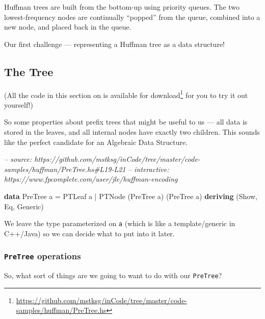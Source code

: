 \documentclass[]{article}
\newenvironment{Shaded}{}{}
\newcommand{\CommentTok}[1]{\textcolor[rgb]{0.38,0.63,0.69}{\textit{#1}}}
\newcommand{\DataTypeTok}[1]{\textcolor[rgb]{0.56,0.13,0.00}{#1}}
\newcommand{\FunctionTok}[1]{\textcolor[rgb]{0.02,0.16,0.49}{#1}}
\newcommand{\KeywordTok}[1]{\textcolor[rgb]{0.00,0.44,0.13}{\textbf{#1}}}
\newcommand{\NormalTok}[1]{#1}
\renewcommand{\href}[2]{#2\footnote{\url{#1}}}
\begin{document}
Huffman trees are built from the bottom-up using priority queues. The two
lowest-frequency nodes are continually ``popped'' from the queue, combined into
a new node, and placed back in the queue.

Our first challenge --- representing a Huffman tree as a data structure!

\hypertarget{the-tree}{%
\subsection{The Tree}\label{the-tree}}

(All the code in this section on is
\href{https://github.com/mstksg/inCode/tree/master/code-samples/huffman/PreTree.hs}{available
for download} for you to try it out yourself!)

So some properties about prefix trees that might be useful to us --- all data is
stored in the leaves, and all internal nodes have exactly two children. This
sounds like the perfect candidate for an Algebraic Data Structure.

\begin{Shaded}
\begin{Highlighting}[]
\CommentTok{-- source: https://github.com/mstksg/inCode/tree/master/code-samples/huffman/PreTree.hs#L19-L21}
\CommentTok{-- interactive: https://www.fpcomplete.com/user/jle/huffman-encoding}

\KeywordTok{data} \DataTypeTok{PreTree}\NormalTok{ a }\FunctionTok{=} \DataTypeTok{PTLeaf}\NormalTok{ a}
               \FunctionTok{|} \DataTypeTok{PTNode}\NormalTok{ (}\DataTypeTok{PreTree}\NormalTok{ a) (}\DataTypeTok{PreTree}\NormalTok{ a)}
               \KeywordTok{deriving}\NormalTok{ (}\DataTypeTok{Show}\NormalTok{, }\DataTypeTok{Eq}\NormalTok{, }\DataTypeTok{Generic}\NormalTok{)}
\end{Highlighting}
\end{Shaded}

We leave the type parameterized on \texttt{a} (which is like a template/generic
in C++/Java) so we can decide what to put into it later.

\hypertarget{pretree-operations}{%
\subsubsection{\texorpdfstring{\texttt{PreTree}
operations}{PreTree operations}}\label{pretree-operations}}

So, what sort of things are we going to want to do with our \texttt{PreTree}?
\end{document}
